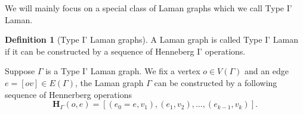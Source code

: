 \documentclass[11pt]{amsart}
\theoremstyle{definition}
\newtheorem{defn}[thm]{Definition}
\theoremstyle{remark}
\numberwithin{equation}{section}
\begin{document}
We will mainly focus on a special class of Laman graphs which we call Type I' Laman.
\begin{defn}[Type I' Laman graphs]
A Laman graph is called Type I' Laman if it can be constructed by a sequence of Henneberg I' operations.
\end{defn}
\iffalse
Given a type 1 Laman graph $\Gamma$, we choose a vertex $o\in V(\Gamma)$ as the base point and fix an edge $e\in E(\Gamma)$ such that $V(e)=\{o,v\}$. From the triple $(\Gamma,o,e)$, one can obtain a poset $\mathbf{H}_{\Gamma}(o,e)$ such that its underlying set is $V(\Gamma)$. For each $u\in \mathbf{H}_{\Gamma}(o,e)-\{o,v\}$, the lower cover set $C_u=\{u',u''\}$ has cardinality 2 and $u',u''$ are comparable. Furthermore, let $C_{<u}=\{v_1,v_2\}$ , we have $v_1\in C_{<v_2}$ or $v_2\in C_{<v_1}$.

From the poset $\mathbf{H}_{\Gamma}(o,e)$, we can choose a total order extension $\vec{\mathbf{H}}_{\Gamma}(o,e)$. Each total order extension corresponds to a sequence of Hennerberg moves which starts from $(o,e)$ and results in $\Gamma$.
\fi

Suppose $\Gamma$ is a Type I' Laman graph. We fix a vertex $o\in V(\Gamma)$ and an edge $e=[ov]\in E(\Gamma)$, the Laman graph $\Gamma$ can be constructed by a following sequence of Hennerberg operations
$$
\mathbf{H}_{\Gamma}(o,e)=[(e_0=e,v_1),(e_1,v_2),\dots,(e_{k-1},v_k)].
$$
\end{document}
